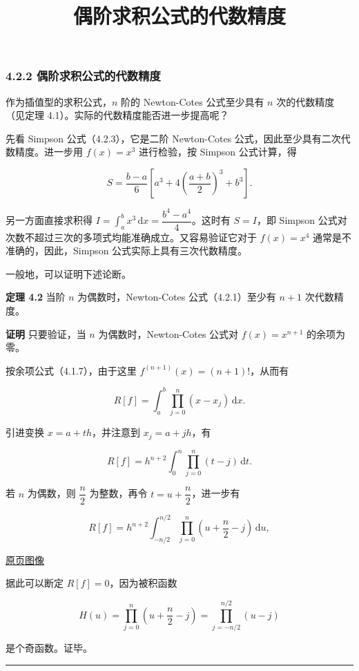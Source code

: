 \documentclass[
  10pt,
  fontset=fandol]{ctexart}
\title{偶阶求积公式的代数精度}
\author{}
\date{}
\begin{document}
\maketitle

\subsubsection{4.2.2 偶阶求积公式的代数精度}\label{ux5076ux9636ux6c42ux79efux516cux5f0fux7684ux4ee3ux6570ux7cbeux5ea6}

作为插值型的求积公式，\(n\) 阶的 Newton-Cotes 公式至少具有 \(n\) 次的代数精度（见定理 4.1）。实际的代数精度能否进一步提高呢？

先看 Simpson 公式（4.2.3），它是二阶 Newton-Cotes 公式，因此至少具有二次代数精度。进一步用 \(f(x)=x^3\) 进行检验，按 Simpson 公式计算，得

\[
S=\frac{b-a}{6}\left[a^3+4\left(\frac{a+b}{2}\right)^3+b^3\right].
\]

另一方面直接求积得 \(I=\int_a^b x^3\,\mathrm{d}x=\dfrac{b^4-a^4}{4}\)。这时有 \(S=I\)，即 Simpson 公式对次数不超过三次的多项式均能准确成立。又容易验证它对于 \(f(x)=x^4\) 通常是不准确的，因此，Simpson 公式实际上具有三次代数精度。

一般地，可以证明下述论断。

\textbf{定理 4.2} 当阶 \(n\) 为偶数时，Newton-Cotes 公式（4.2.1）至少有 \(n+1\) 次代数精度。

\textbf{证明} 只要验证，当 \(n\) 为偶数时，Newton-Cotes 公式对 \(f(x)=x^{n+1}\) 的余项为零。

按余项公式（4.1.7），由于这里 \(f^{(n+1)}(x)=(n+1)!\)，从而有

\[
R[f]=\int_a^b\prod_{j=0}^n(x-x_j)\,\mathrm{d}x.
\]

引进变换 \(x=a+th\)，并注意到 \(x_j=a+jh\)，有

\[
R[f]=h^{n+2}\int_0^n\prod_{j=0}^n(t-j)\,\mathrm{d}t.
\]

若 \(n\) 为偶数，则 \(\dfrac n2\) 为整数，再令 \(t=u+\dfrac n2\)，进一步有

\[
R[f]=h^{n+2}\int_{-n/2}^{n/2}\prod_{j=0}^n\left(u+\frac n2-j\right)\,\mathrm{d}u,
\]

\href{../../source-images/pdf-098.jpeg}{原页图像}

据此可以断定 \(R[f]=0\)，因为被积函数

\[
H(u)=\prod_{j=0}^n\left(u+\frac n2-j\right)=\prod_{j=-n/2}^{n/2}(u-j)
\]

是个奇函数。证毕。

\begin{center}\rule{0.5\linewidth}{0.5pt}\end{center}
\end{document}

